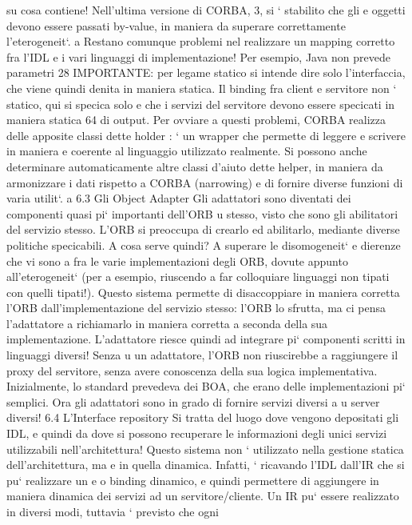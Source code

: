 \documentclass[a4paper,12pt]{article}
\begin{document}
su cosa contiene! Nell'ultima versione di CORBA, 3, si ` stabilito che gli
e
oggetti devono essere passati by-value, in maniera da superare correttamente
l'eterogeneit`.
a
Restano comunque problemi nel realizzare un mapping corretto fra l'IDL e
i vari linguaggi di implementazione! Per esempio, Java non prevede parametri
28 IMPORTANTE: per legame statico si intende dire solo l'interfaccia, che viene quindi
denita in maniera statica. Il binding fra client e servitore non ` statico, qui si specica solo
e
che i servizi del servitore devono essere specicati in maniera statica
64
di output. Per ovviare a questi problemi, CORBA realizza delle apposite classi dette holder : ` un wrapper che permette
di leggere e scrivere in maniera
e
coerente al linguaggio utilizzato realmente. Si possono anche determinare automaticamente altre classi d'aiuto dette
helper, in maniera da armonizzare i dati
rispetto a CORBA (narrowing) e di fornire diverse funzioni di varia utilit`.
a
6.3
Gli Object Adapter
Gli adattatori sono diventati dei componenti quasi pi` importanti dell'ORB
u
stesso, visto che sono gli abilitatori del servizio stesso. L'ORB si preoccupa di
crearlo ed abilitarlo, mediante diverse politiche specicabili.
A cosa serve quindi? A superare le disomogeneit` e dierenze che vi sono
a
fra le varie implementazioni degli ORB, dovute appunto all'eterogeneit` (per
a
esempio, riuscendo a far colloquiare linguaggi non tipati con quelli tipati!).
Questo sistema permette di disaccoppiare in maniera corretta l'ORB dall'implementazione del servizio stesso: l'ORB lo
sfrutta, ma ci pensa l'adattatore a
richiamarlo in maniera corretta a seconda della sua implementazione. L'adattatore riesce quindi ad integrare pi`
componenti scritti in linguaggi diversi! Senza
u
un adattatore, l'ORB non riuscirebbe a raggiungere il proxy del servitore, senza
avere conoscenza della sua logica implementativa.
Inizialmente, lo standard prevedeva dei BOA, che erano delle implementazioni pi` semplici. Ora gli adattatori sono in
grado di fornire servizi diversi a
u
server diversi!
6.4
L'Interface repository
Si tratta del luogo dove vengono depositati gli IDL, e quindi da dove si possono
recuperare le informazioni degli unici servizi utilizzabili nell'architettura!
Questo sistema non ` utilizzato nella gestione statica dell'architettura, ma
e
in quella dinamica. Infatti, ` ricavando l'IDL dall'IR che si pu` realizzare un
e
o
binding dinamico, e quindi permettere di aggiungere in maniera dinamica dei
servizi ad un servitore/cliente.
Un IR pu` essere realizzato in diversi modi, tuttavia ` previsto che ogni
\end{document}
